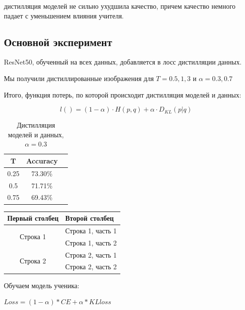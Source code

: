 \documentclass[12pt]{article}
\begin{document}
 дистилляция моделей не сильно ухудшила качество, причем качество немного падает с уменьшением влияния учителя.



\subsection{Основной эксперимент}

ResNet50, обученный на всех данных, добавляется в лосс дистилляции данных. 


Мы получили дистиллированные изображения для $T=0.5, 1, 3$ и $\alpha = 0.3, 0.7$

Итого, функция потерь, по которой происходит дистилляция моделей и данных:

$$
l() = (1 - \alpha) \cdot H(p, q) + \alpha \cdot D_{KL}(p|q)
$$

\begin{table}[htbp]
  \centering
  \begin{tabular}{|c|c|c|}
    \hline
    T & Accuracy \\ \hline
    0.25 & 73.30\% \\ \hline
    0.5 & 71.71\% \\ \hline
    0.75 & 69.43\% \\ \hline
  \end{tabular}
  \caption{Дистилляция моделей и данных, $\alpha = 0.3$}
  \label{tab:my-table}
\end{table}

\begin{tabular}{|c|>{\centering\arraybackslash}m{4cm}|}
  \hline
  Первый столбец & Второй столбец \\
  \hline
  \multirow{2}{*}{Строка 1} & Строка 1, часть 1 \\
                            & Строка 1, часть 2 \\
  \hline
  \multirow{2}{*}{Строка 2} & Строка 2, часть 1 \\
                            & Строка 2, часть 2 \\
  \hline
\end{tabular}




Обучаем модель ученика:

$Loss = (1 - \alpha) * CE + \alpha * KLloss$


\end{document}

